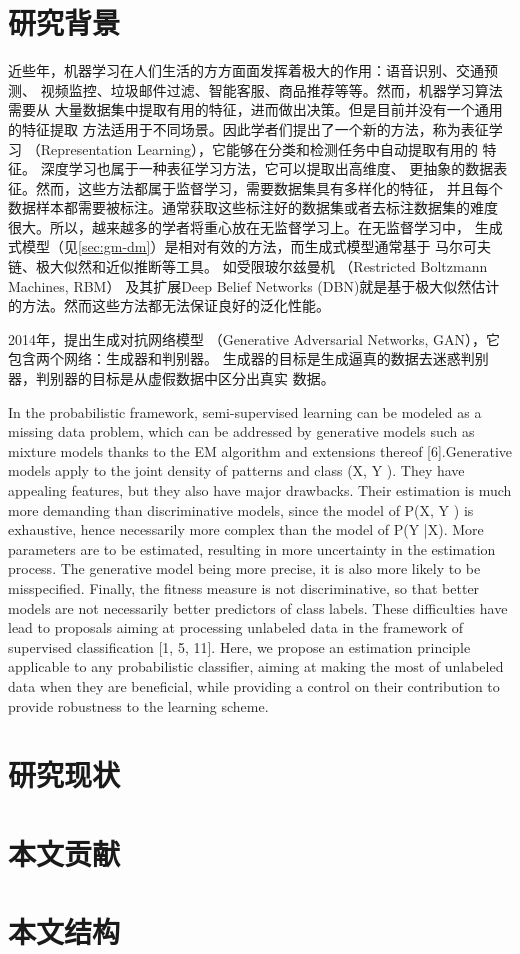 \section{研究背景}
近些年，机器学习在人们生活的方方面面发挥着极大的作用：语音识别、交通预测、
视频监控、垃圾邮件过滤、智能客服、商品推荐等等。然而，机器学习算法需要从
大量数据集中提取有用的特征，进而做出决策。但是目前并没有一个通用的特征提取
方法适用于不同场景。因此学者们提出了一个新的方法，称为表征学习
（Representation Learning），它能够在分类和检测任务中自动提取有用的
特征\cite{bengio2013representation}。
深度学习\cite{lecun2015deep}也属于一种表征学习方法，它可以提取出高维度、
更抽象的数据表征。然而，这些方法都属于监督学习，需要数据集具有多样化的特征，
并且每个数据样本都需要被标注。通常获取这些标注好的数据集或者去标注数据集的难度
很大。所以，越来越多的学者将重心放在无监督学习上。在无监督学习中，
生成式模型（见\ref{sec:gm-dm}）是相对有效的方法，而生成式模型通常基于
马尔可夫链、极大似然和近似推断等工具。
如受限玻尔兹曼机
（Restricted Boltzmann Machines, RBM）\cite{smolensky1986information}
及其扩展Deep Belief Networks (DBN)\cite{hinton2006fast}就是基于极大似然估计
的方法。然而这些方法都无法保证良好的泛化性能。

2014年，\citet{goodfellow2014generative}提出生成对抗网络模型
（Generative Adversarial Networks, GAN），它包含两个网络：生成器和判别器。
生成器的目标是生成逼真的数据去迷惑判别器，判别器的目标是从虚假数据中区分出真实
数据。

In the probabilistic framework, semi-supervised learning can be modeled as a missing data
problem, which can be addressed by generative models such as mixture models thanks
to the EM algorithm and extensions thereof [6].Generative models apply to the joint density of patterns and class (X, Y ). They have appealing features, but they also have major
drawbacks. Their estimation is much more demanding than discriminative models, since
the model of P(X, Y ) is exhaustive, hence necessarily more complex than the model of
P(Y |X). More parameters are to be estimated, resulting in more uncertainty in the estimation process. The generative model being more precise, it is also more likely to be
misspecified. Finally, the fitness measure is not discriminative, so that better models are
not necessarily better predictors of class labels. These difficulties have lead to proposals
aiming at processing unlabeled data in the framework of supervised classification [1, 5, 11].
Here, we propose an estimation principle applicable to any probabilistic classifier, aiming
at making the most of unlabeled data when they are beneficial, while providing a control
on their contribution to provide robustness to the learning scheme.


\section{研究现状}
\section{本文贡献}
\section{本文结构}
